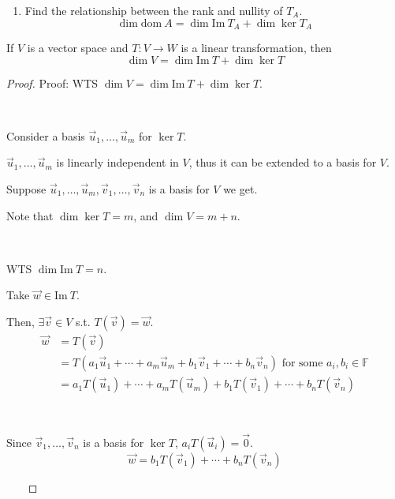 \documentclass[11pt,fleqn]{book} %
\begin{document}
\begin{example}
\begin{enumerate}
        \item Find the relationship between the rank and nullity of $T_A$.
        $$\dim \mathrm{dom}~A = \dim \mathrm{Im}~T_A + \dim \ker  T_A $$
    \end{enumerate}
\end{example}

\setcounter{section}{3}
\setcounter{dummy}{16}
\begin{theorem}
    If $V$ is a  vector space and $T: V \to W$ is a linear transformation, then $$\dim V = \dim \mathrm{Im}~T + \dim \ker T$$
\end{theorem}
\setcounter{section}{2}

\begin{proof}
    Proof: WTS $\dim V = \dim \mathrm{Im}~T + \dim \ker T$.

    {~~~}

    Consider a basis $\vec{u}_1, \dots, \vec{u}_m$ for $\ker T$.

    $\vec{u}_1, \dots, \vec{u}_m$ is linearly independent in $V$, thus it can be extended to a basis for $V$.

    Suppose $\vec{u}_1, \dots, \vec{u}_m, \vec{v}_1, \dots, \vec{v}_n$ is a basis for $V$ we get.

    Note that $\dim \ker T = m$, and $\dim V = m + n$.

    {~~~}

    WTS $\dim \mathrm{Im}~T = n$.

    Take $\vec{w} \in \mathrm{Im}~T$.

    Then, $\exists \vec{v} \in V$ s.t. $T(\vec{v}) = \vec{w}$.
    \begin{align*}
        \vec{w}
        &=T(\vec{v})
        \\
        &= T(a_1\vec{u}_1 + \cdots + a_m\vec{u}_m + b_1\vec{v}_1 + \cdots + b_n\vec{v}_n)
        \text{ for some }a_i, b_i \in \mathbb{F}
        \\
        &= a_1T(\vec{u}_1) + \cdots + a_mT(\vec{u}_m) + b_1T(\vec{v}_1) + \cdots + b_nT(\vec{v}_n)
    \end{align*}

    {~~~}

    Since $\vec{v}_1, \dots, \vec{v}_n$ is a basis for $\ker T$, $a_iT(\vec{u}_i) = \vec{0}$.
    $$\vec{w} = b_1T(\vec{v}_1) + \cdots + b_nT(\vec{v}_n)$$

    {~~~}


\end{proof}
\end{document}
